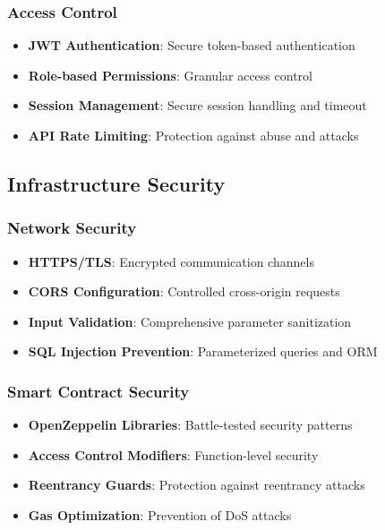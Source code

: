 \documentclass[11pt,a4paper]{article}
\begin{document}
\subsubsection{Access Control}
\begin{itemize}
    \item \textbf{JWT Authentication}: Secure token-based authentication
    \item \textbf{Role-based Permissions}: Granular access control
    \item \textbf{Session Management}: Secure session handling and timeout
    \item \textbf{API Rate Limiting}: Protection against abuse and attacks
\end{itemize}

\subsection{Infrastructure Security}

\subsubsection{Network Security}
\begin{itemize}
    \item \textbf{HTTPS/TLS}: Encrypted communication channels
    \item \textbf{CORS Configuration}: Controlled cross-origin requests
    \item \textbf{Input Validation}: Comprehensive parameter sanitization
    \item \textbf{SQL Injection Prevention}: Parameterized queries and ORM
\end{itemize}

\subsubsection{Smart Contract Security}
\begin{itemize}
    \item \textbf{OpenZeppelin Libraries}: Battle-tested security patterns
    \item \textbf{Access Control Modifiers}: Function-level security
    \item \textbf{Reentrancy Guards}: Protection against reentrancy attacks
    \item \textbf{Gas Optimization}: Prevention of DoS attacks
\end{itemize}
\end{document}
